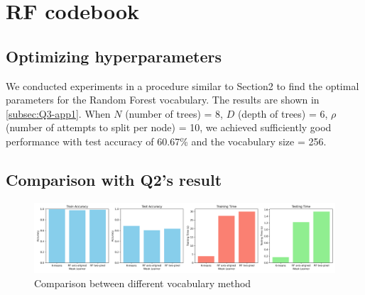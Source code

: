 \section{RF codebook}
\label{sec:intro}


\subsection{Optimizing hyperparameters}
We conducted experiments in a procedure similar to Section2 to find the optimal parameters for the Random Forest vocabulary. The results are shown in \cref{subsec:Q3-app1}. When $N$ (number of trees) = 8, $D$ (depth of trees) = 6, $\rho$ (number of attempts to split per node) = 10, we achieved sufficiently good performance with test accuracy of 60.67\% and the vocabulary size = 256.

\subsection{Comparison with Q2's result}



\begin{figure}[htbp]
	\centering
	\includegraphics[width=0.8\linewidth]{image/q3-fig4.png}
	\caption{Comparison between different vocabulary method}
	\label{fig:q3-fig4}
\end{figure}